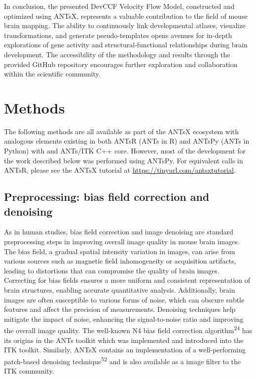 \documentclass[
  12pt,
]{article}
\begin{document}
In conclusion, the presented DevCCF Velocity Flow Model, constructed and
optimized using ANTsX, represents a valuable contribution to the field
of mouse brain mapping. The ability to continuously link developmental
atlases, visualize transformations, and generate pseudo-templates opens
avenues for in-depth explorations of gene activity and
structural-functional relationships during brain development. The
accessibility of the methodology and results through the provided GitHub
repository encourages further exploration and collaboration within the
scientific community. \clearpage \newpage

\hypertarget{methods}{%
\section*{Methods}\label{methods}}

The following methods are all available as part of the ANTsX ecosystem
with analogous elements existing in both ANTsR (ANTs in R) and ANTsPy
(ANTs in Python) with and ANTs/ITK C++ core. However, most of the
development for the work described below was performed using ANTsPy. For
equivalent calls in ANTsR, please see the ANTsX tutorial at
\url{https://tinyurl.com/antsxtutorial}.

\hypertarget{preprocessing-bias-field-correction-and-denoising}{%
\subsection*{Preprocessing: bias field correction and
denoising}\label{preprocessing-bias-field-correction-and-denoising}}

As in human studies, bias field correction and image denoising are
standard preprocessing steps in improving overall image quality in mouse
brain images. The bias field, a gradual spatial intensity variation in
images, can arise from various sources such as magnetic field
inhomogeneity or acquisition artifacts, leading to distortions that can
compromise the quality of brain images. Correcting for bias fields
ensures a more uniform and consistent representation of brain
structures, enabling accurate quantitative analysis. Additionally, brain
images are often susceptible to various forms of noise, which can
obscure subtle features and affect the precision of measurements.
Denoising techniques help mitigate the impact of noise, enhancing the
signal-to-noise ratio and improving the overall image quality. The
well-known N4 bias field correction algorithm\textsuperscript{24} has
its origins in the ANTs toolkit which was implemented and introduced
into the ITK toolkit. Similarly, ANTsX contains an implementation of a
well-performing patch-based denoising technique\textsuperscript{52} and
is also available as a image filter to the ITK community.
\end{document}
